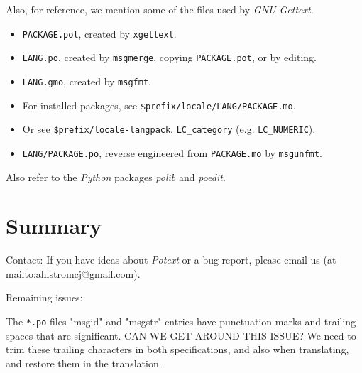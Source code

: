 \documentclass[
 11pt,
 twoside,
 a4paper,
 final                                 %
]{article}
\begin{document}
   Also, for reference, we mention some of the files used by
   \textsl{GNU Gettext}.

   \begin{itemize}
      \item \texttt{PACKAGE.pot}, created by \texttt{xgettext}.
      \item \texttt{LANG.po}, created by \texttt{msgmerge},
         copying \texttt{PACKAGE.pot}, or by editing.
      \item \texttt{LANG.gmo}, created by \texttt{msgfmt}.
      \item For installed packages, see
         \texttt{\$prefix/locale/LANG/PACKAGE.mo}.
      \item Or see
         \texttt{\$prefix/locale-langpack}.
         \texttt{LC\_category} (e.g. \texttt{LC\_NUMERIC}).
      \item \texttt{LANG/PACKAGE.po}, reverse engineered from
         \texttt{PACKAGE.mo} by \texttt{msgunfmt}.
   \end{itemize}

   Also refer to the \textsl{Python} packages \textsl{polib}
   and \textsl{poedit}.







\section{Summary}
\label{sec:summary}

   Contact: If you have ideas about \textsl{Potext} or a bug report,
   please email us (at \url{mailto:ahlstromcj@gmail.com}).

   Remaining issues:

   The \texttt{*.po} files "msgid" and "msgstr" entries have punctuation marks
   and trailing spaces that are significant.
   CAN WE GET AROUND THIS ISSUE?
   We need to trim these trailing characters in both specifications,
   and also when translating, and restore them in the translation.




\printindex
\end{document}
